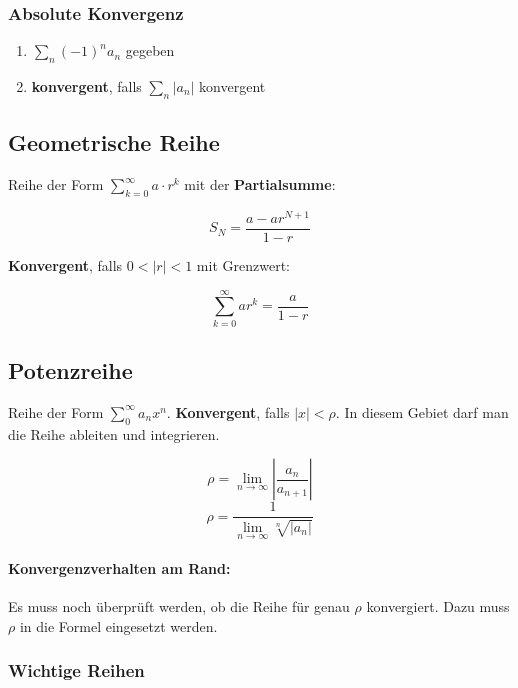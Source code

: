 \documentclass[11pt]{article}
\begin{document}
\subsubsection*{Absolute Konvergenz}

\begin{enumerate}
	\item $\sum_n (-1)^n a_n$ gegeben
	\item \textbf{konvergent}, falls $\sum_n |a_n|$ konvergent
\end{enumerate}

\subsection{Geometrische Reihe}

Reihe der Form $\sum^\infty_{k = 0} a \cdot r^k$ mit der \textbf{Partialsumme}:

\begin{equation*}
	S_N=\frac{a-ar^{N+1}}{1-r}
\end{equation*}

\textbf{Konvergent}, falls $0<|r|<1$ mit Grenzwert:

\begin{equation*}
	\sum^\infty_{k=0}ar^k=\frac{a}{1-r}
\end{equation*}

\subsection{Potenzreihe}

Reihe der Form $\sum^\infty_0 a_nx^n$. \textbf{Konvergent}, falls $|x|<\rho$. In diesem Gebiet darf man die Reihe ableiten und integrieren.

\begin{equation*}
	\rho= \lim_{n\rightarrow \infty}|\frac{a_n}{a_{n+1}}|
\end{equation*}
\begin{equation*}
	\rho=\frac{1}{\lim_{n\rightarrow \infty}\sqrt[n]{|a_n|}}
\end{equation*}

\paragraph{Konvergenzverhalten am Rand:} Es muss noch {\"u}berpr{\"u}ft werden, ob die Reihe f{\"u}r genau $\rho$ konvergiert. Dazu muss $\rho$ in die Formel eingesetzt werden.

\subsubsection{Wichtige Reihen}
\end{document}
